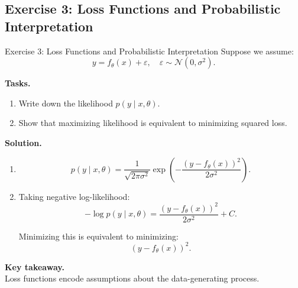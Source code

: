 \documentclass[aspectratio=169,11pt]{beamer}
\begin{document}
\subsection{Exercise 3: Loss Functions and Probabilistic Interpretation}
\begin{frame}[t,allowframebreaks]{Exercise 3: Loss Functions and Probabilistic Interpretation}
\small
Suppose we assume:
\[
y = f_\theta(x) + \varepsilon, \quad \varepsilon \sim \mathcal{N}(0, \sigma^2).
\]

\textbf{Tasks.}\\ \begin{enumerate}
    \item Write down the likelihood $p(y \mid x, \theta)$.
    \item Show that maximizing likelihood is equivalent to minimizing squared loss.
\end{enumerate}

\textbf{Solution.}\\ \begin{enumerate}
    \item 
    \[
    p(y \mid x, \theta)
    =
    \frac{1}{\sqrt{2\pi \sigma^2}}
    \exp\left(-\frac{(y - f_\theta(x))^2}{2\sigma^2}\right).
    \]

    \item Taking negative log-likelihood:
    \[
    -\log p(y \mid x, \theta)
    =
    \frac{(y - f_\theta(x))^2}{2\sigma^2} + C.
    \]

    Minimizing this is equivalent to minimizing:
    \[
    (y - f_\theta(x))^2.
    \]
\end{enumerate}

\textbf{Key takeaway.}\\ Loss functions encode assumptions about the data-generating process.
\end{frame}
\end{document}
